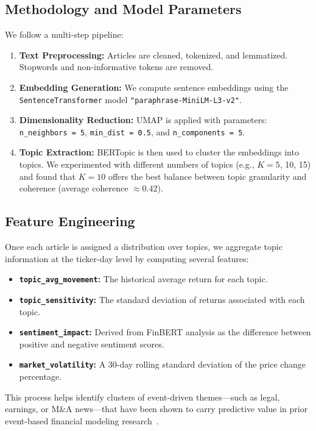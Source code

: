 \documentclass[twocolumn]{article}
\begin{document}
\subsection{Methodology and Model Parameters}
We follow a multi-step pipeline:
\begin{enumerate}
    \item \textbf{Text Preprocessing:} Articles are cleaned, tokenized, and lemmatized. Stopwords and non-informative tokens are removed.
    \item \textbf{Embedding Generation:} We compute sentence embeddings using the \texttt{SentenceTransformer} model \texttt{"paraphrase-MiniLM-L3-v2"}.
    \item \textbf{Dimensionality Reduction:} UMAP is applied with parameters: \texttt{n\_neighbors = 5}, \texttt{min\_dist = 0.5}, and \texttt{n\_components = 5}.
    \item \textbf{Topic Extraction:} BERTopic is then used to cluster the embeddings into topics. We experimented with different numbers of topics (e.g., $K=5$, 10, 15) and found that $K=10$ offers the best balance between topic granularity and coherence (average coherence $\approx 0.42$).
\end{enumerate}

\subsection{Feature Engineering}
Once each article is assigned a distribution over topics, we aggregate topic information at the ticker-day level by computing several features:
\begin{itemize}
    \item \textbf{\texttt{topic\_avg\_movement}:} The historical average return for each topic.
    \item \textbf{\texttt{topic\_sensitivity}:} The standard deviation of returns associated with each topic.
    \item \textbf{\texttt{sentiment\_impact}:} Derived from FinBERT analysis as the difference between positive and negative sentiment scores.
    \item \textbf{\texttt{market\_volatility}:} A 30-day rolling standard deviation of the price change percentage.
\end{itemize}

This process helps identify clusters of event-driven themes—such as legal, earnings, or M\&A news—that have been shown to carry predictive value in prior event-based financial modeling research~\cite{hu2018}.
\end{document}
